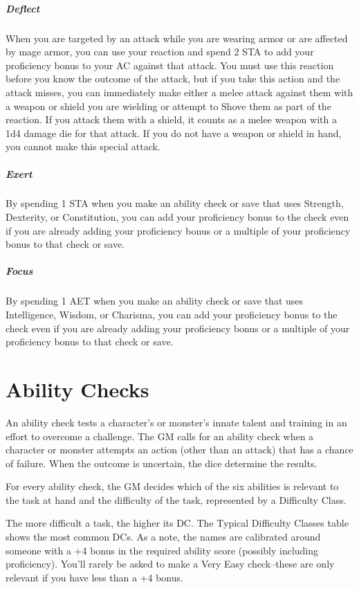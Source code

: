\subparagraph{Deflect}\label{action:deflect}  When you are targeted by an attack while you are wearing armor or are affected by mage armor, you can use your reaction and spend 2 STA to add your proficiency bonus to your AC against that attack. You must use this reaction before you know the outcome of the attack, but if you take this action and the attack misses, you can immediately make either a melee attack against them with a weapon or shield you are wielding or attempt to Shove them as part of the reaction. If you attack them with a shield, it counts as a melee weapon with a 1d4 damage die for that attack. If you do not have a weapon or shield in hand, you cannot make this special attack.

\subparagraph{Exert}\label{action:exert} By spending 1 STA when you make an ability check or save that uses Strength, Dexterity, or Constitution, you can add your proficiency bonus to the check even if you are already adding your proficiency bonus or a multiple of your proficiency bonus to that check or save.

\subparagraph{Focus}\label{action:focus} By spending 1 AET when you make an ability check or save that uses Intelligence, Wisdom, or Charisma, you can add your proficiency bonus to the check even if you are already adding your proficiency bonus or a multiple of your proficiency bonus to that check or save.

\section{Ability Checks}

An ability check tests a character's or monster's innate talent and training in an effort to overcome a challenge. The GM calls for an ability check when a character or monster attempts an action (other than an attack) that has a chance of failure. When the outcome is uncertain, the dice determine the results.

For every ability check, the GM decides which of the six abilities is relevant to the task at hand and the difficulty of the task, represented by a Difficulty Class.

The more difficult a task, the higher its DC. The Typical Difficulty Classes table shows the most common DCs. As a note, the names are calibrated around someone with a +4 bonus in the required ability score (possibly including proficiency). You'll rarely be asked to make a Very Easy check--these are only relevant if you have less than a +4 bonus.

